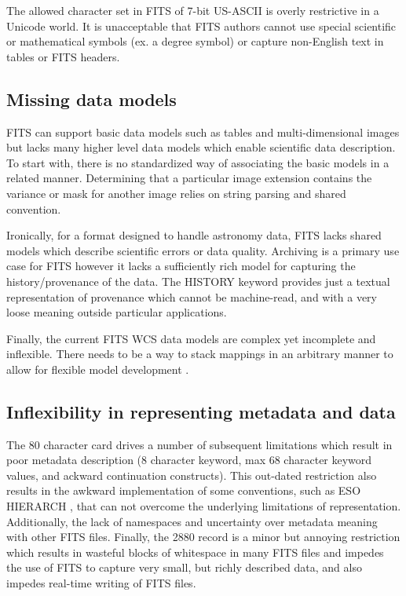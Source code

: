 \documentclass[11pt,twoside]{article}
\begin{document}
The allowed character set in FITS of 7-bit US-ASCII is overly restrictive in a
Unicode world. It is unacceptable that FITS authors cannot use special 
scientific or mathematical symbols (ex. a degree symbol) or capture 
non-English text in tables or FITS headers.

\subsection{Missing data models}

FITS can support basic data models such as tables and multi-dimensional 
images but lacks many higher level data models which enable scientific
data description. To start with, there is no standardized way of associating
the basic models in a related manner. Determining that a particular image 
extension contains the variance or mask for another image relies on string 
parsing and shared convention. 

Ironically, for a format designed to handle astronomy data, FITS lacks shared
models which describe scientific errors or data quality. Archiving is
a primary use case for FITS however it lacks a sufficiently rich model 
for capturing the history/provenance of the data.
The HISTORY keyword provides just a textual representation of
provenance which cannot be machine-read, and with a very loose 
meaning outside particular applications.

Finally, the current FITS WCS data models are complex yet incomplete and
inflexible. There needs to be a way to stack mappings in an arbitrary
manner to allow for flexible model development \citep[see
e.g.][]{1998ASPC..145...41W,2012ASPC..461..825B,O35_adassxxii}.


\subsection{Inflexibility in representing metadata and data}

The 80 character card drives a number of subsequent limitations which
result in poor metadata description (8 character keyword, max 68 character keyword values, and ackward continuation constructs). 
This out-dated restriction also results in the awkward implementation 
of some conventions, such as ESO HIERARCH \citep{2009Wic}, that can not 
overcome the underlying limitations of representation. Additionally, the lack of 
namespaces and uncertainty over metadata meaning with other FITS files.
Finally, the 2880 record is a minor but annoying restriction which results
in wasteful blocks of whitespace in many FITS files and impedes the use
of FITS to capture very small, but richly described
data, and also impedes real-time writing of FITS files.
\end{document}
